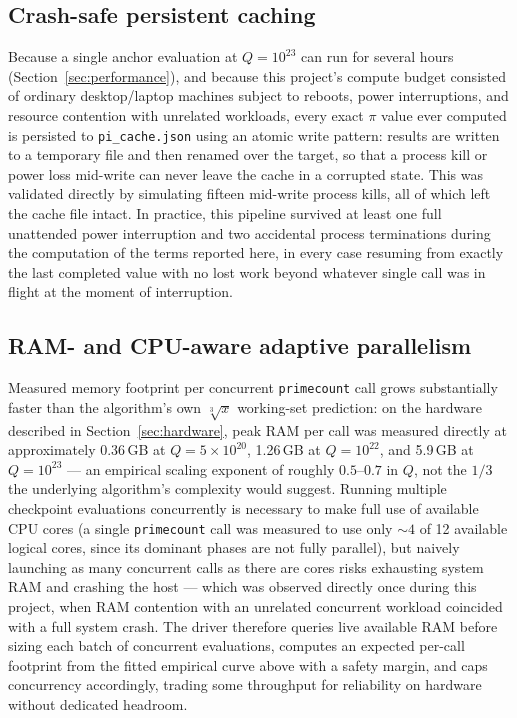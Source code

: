 \documentclass[11pt]{amsart}
\newcommand{\pcount}{\pi}
\begin{document}
\subsection{Crash-safe persistent caching}

Because a single anchor evaluation at $Q=10^{23}$ can run for several
hours (Section~\ref{sec:performance}), and because this project's
compute budget consisted of ordinary desktop/laptop machines subject to
reboots, power interruptions, and resource contention with unrelated
workloads, every exact $\pcount$ value ever computed is persisted to
\texttt{pi\_cache.json} using an atomic write pattern: results are
written to a temporary file and then renamed over the target, so that a
process kill or power loss mid-write can never leave the cache in a
corrupted state. This was validated directly by simulating fifteen
mid-write process kills, all of which left the cache file intact. In
practice, this pipeline survived at least one full unattended power
interruption and two accidental process terminations during the
computation of the terms reported here, in every case resuming from
exactly the last completed value with no lost work beyond whatever
single call was in flight at the moment of interruption.

\subsection{RAM- and CPU-aware adaptive parallelism}

Measured memory footprint per concurrent \texttt{primecount} call grows
substantially faster than the algorithm's own $\sqrt[3]{x}$ working-set
prediction: on the hardware described in Section~\ref{sec:hardware},
peak RAM per call was measured directly at approximately 0.36\,GB at
$Q=5\times10^{20}$, 1.26\,GB at $Q=10^{22}$, and 5.9\,GB at $Q=10^{23}$
--- an empirical scaling exponent of roughly $0.5$--$0.7$ in $Q$, not the
$1/3$ the underlying algorithm's complexity would suggest. Running
multiple checkpoint evaluations concurrently is necessary to make full
use of available CPU cores (a single \texttt{primecount} call was
measured to use only $\sim\!4$ of 12 available logical cores, since its
dominant phases are not fully parallel), but naively launching as many
concurrent calls as there are cores risks exhausting system RAM and
crashing the host --- which was observed directly once during this
project, when RAM contention with an unrelated concurrent workload
coincided with a full system crash. The driver therefore queries live
available RAM before sizing each batch of concurrent evaluations,
computes an expected per-call footprint from the fitted empirical curve
above with a safety margin, and caps concurrency accordingly, trading
some throughput for reliability on hardware without dedicated headroom.
\end{document}
